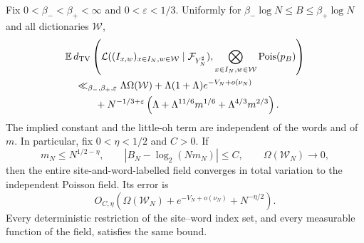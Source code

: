\begin{theorem}
\label{thm:word-field}
Fix $0<\beta_-<\beta_+<\infty$ and $0<\varepsilon<1/3$. Uniformly for
$\beta_-\log N\le B\le\beta_+\log N$ and all dictionaries $\mathcal W$,
\begin{align}
 &\mathbb E\,d_{\mathrm{TV}}\left(\mathcal L((I_{x,w})_{x\in I_N,w\in\mathcal W}
                       \mid\mathcal F_{Y_N^\sharp}),
            \bigotimes_{x\in I_N,w\in\mathcal W}\operatorname{Pois}(p_B)\right)
       \notag\\
 &\quad\ll_{\beta_-,\beta_+,\varepsilon}
 \Lambda\Omega(\mathcal W)
 +\Lambda(1+\Lambda)e^{-V_N+o(\nu_N)}\notag\\
 &\qquad\quad
 +N^{-1/3+\varepsilon}
       \left(\Lambda+\Lambda^{11/6}m^{1/6}
                       +\Lambda^{4/3}m^{2/3}\right).
       \label{eq:word-field-rate}
\end{align}
The implied constant and the little-oh term are independent of the words
and of $m$. In particular, fix $0<\eta<1/2$ and $C>0$. If
\begin{equation}\label{eq:dictionary-critical}
 m_N\le N^{1/2-\eta},\qquad
 |B_N-\log_2(Nm_N)|\le C,\qquad
 \Omega(\mathcal W_N)\longrightarrow0,
\end{equation}
then the entire site-and-word-labelled field converges in total variation
to the independent Poisson field. Its error is
\begin{equation}\label{eq:dictionary-critical-rate}
 O_{C,\eta}\!\left(\Omega(\mathcal W_N)
                  +e^{-V_N+o(\nu_N)}+N^{-\eta/2}\right).
\end{equation}
Every deterministic restriction of the site--word index set, and every
measurable function of the field, satisfies the same bound.
\end{theorem}
